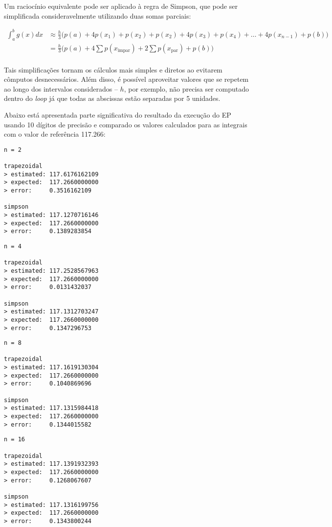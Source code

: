 \documentclass[11pt,reqno,a4paper]{amsart}
\begin{document}
\bigskip
Um raciocínio equivalente pode ser aplicado à regra de Simpson, que pode ser simplificada consideravelmente utilizando duas somas parciais:

\begin{align*}
    \int_a^b g(x) dx &\approx \frac{h}{3} \Big(p(a) + 4p(x_1) + p(x_2) + p(x_2) + 4p(x_3) + p(x_4) + \ldots + 4p(x_{n-1}) + p(b)\Big)\\
        &= \frac{h}{3} \Big(p(a) + 4\sum p(x_{\text{ímpar}}) + 2 \sum p(x_{\text{par}}) + p(b)\Big)\\
\end{align*}

\bigskip
Tais simplificações tornam os cálculos mais simples e diretos ao evitarem cômputos desnecessários. Além disso, é possível aproveitar valores que se repetem ao longo dos intervalos considerados – $h$, por exemplo, não precisa ser computado dentro do \textit{loop} já que todas as abscissas estão separadas por 5 unidades.

\bigskip
Abaixo está apresentada parte significativa do resultado da execução do EP usando 10 dígitos de precisão e comparado os valores calculados para as integrais com o valor de referência 117.266:


\begin{verbatim}
n = 2

trapezoidal
> estimated: 117.6176162109
> expected:  117.2660000000
> error:     0.3516162109

simpson
> estimated: 117.1270716146
> expected:  117.2660000000
> error:     0.1389283854
\end{verbatim}

\begin{verbatim}
n = 4

trapezoidal
> estimated: 117.2528567963
> expected:  117.2660000000
> error:     0.0131432037

simpson
> estimated: 117.1312703247
> expected:  117.2660000000
> error:     0.1347296753
\end{verbatim}

\begin{verbatim}
n = 8

trapezoidal
> estimated: 117.1619130304
> expected:  117.2660000000
> error:     0.1040869696

simpson
> estimated: 117.1315984418
> expected:  117.2660000000
> error:     0.1344015582
\end{verbatim}

\begin{verbatim}
n = 16

trapezoidal
> estimated: 117.1391932393
> expected:  117.2660000000
> error:     0.1268067607

simpson
> estimated: 117.1316199756
> expected:  117.2660000000
> error:     0.1343800244
\end{verbatim}
\end{document}
